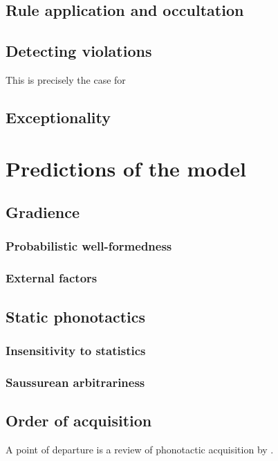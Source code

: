 \subsection{Rule application and occultation}

\subsection{Detecting violations}

This is precisely the case for 

\subsection{Exceptionality}

\section{Predictions of the model}

\subsection{Gradience}
\subsubsection{Probabilistic well-formedness}
\subsubsection{External factors}

\subsection{Static phonotactics}
\subsubsection{Insensitivity to statistics}
\subsubsection{Saussurean arbitrariness}

\subsection{Order of acquisition}

A point of departure is a review of phonotactic acquisition by \citet{Hayes2004b}.


